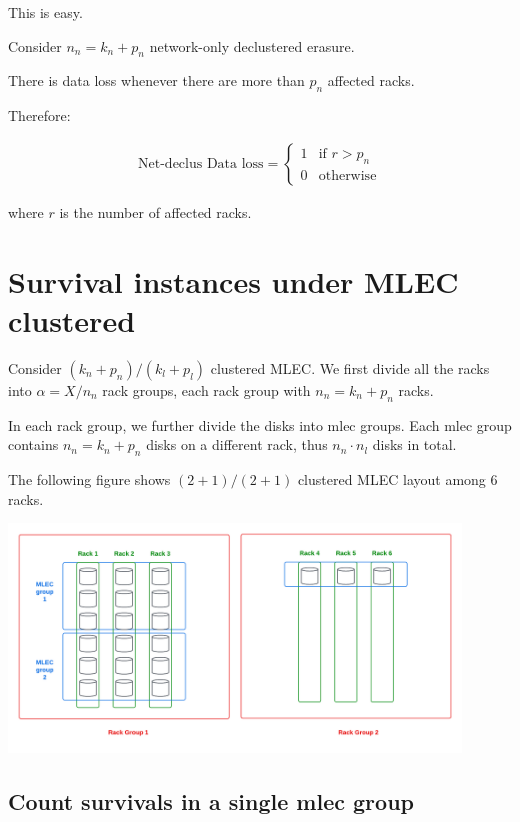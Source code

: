 \documentclass{article}
\begin{document}
This is easy.

Consider $n_n=k_n+p_n$ network-only declustered erasure.

There is data loss whenever there are more than $p_n$ affected racks.

Therefore:

\begin{eqnarray}
  \text{Net-declus Data loss} =
    \begin{cases}
      1 & \text{if $r > p_n$}\\
      0 & \text{otherwise}
    \end{cases}       
\label{eq:net_dp:1}
\end{eqnarray}

where $r$ is the number of affected racks.






\section{Survival instances under MLEC clustered}

Consider $(k_n+p_n)/(k_l+p_l)$ clustered MLEC.
We first divide all the racks into $\alpha = X / n_n$ rack groups, each rack group with $n_n=k_n+p_n$ racks.

In each rack group, we further divide the disks into mlec groups. Each mlec group contains $n_n=k_n+p_n$ disks on a different rack, thus $n_n \cdot n_l$ disks in total.

The following figure shows $(2+1)/(2+1)$ clustered MLEC layout among 6 racks.

\begin{center}
    \includegraphics[width=0.9\textwidth]{mlec_layout.png}
\end{center}


\subsection{Count survivals in a single mlec group}
\end{document}
